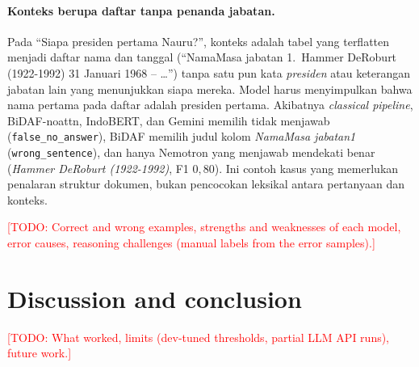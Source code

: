 \documentclass[11pt,a4paper]{article}
\newcommand{\todo}[1]{\textcolor{red}{[TODO: #1]}}
\begin{document}
\paragraph{Konteks berupa daftar tanpa penanda jabatan.}
Pada ``Siapa presiden pertama Nauru?'', konteks adalah tabel yang terflatten menjadi daftar nama dan tanggal
(``NamaMasa jabatan 1.\ Hammer DeRoburt (1922-1992) 31 Januari 1968 -- \ldots{}'') tanpa satu pun kata \textit{presiden}
atau keterangan jabatan lain yang menunjukkan siapa mereka. Model harus menyimpulkan bahwa nama pertama pada daftar adalah
presiden pertama. Akibatnya \textit{classical pipeline}, BiDAF-noattn, IndoBERT, dan Gemini memilih tidak menjawab
(\texttt{false\_no\_answer}), BiDAF memilih judul kolom \textit{NamaMasa jabatan1} (\texttt{wrong\_sentence}), dan hanya
Nemotron yang menjawab mendekati benar (\textit{Hammer DeRoburt (1922-1992)}, F1 $0{,}80$). Ini contoh kasus yang
memerlukan penalaran struktur dokumen, bukan pencocokan leksikal antara pertanyaan dan konteks.

\todo{Correct and wrong examples, strengths and weaknesses of each model, error causes, reasoning challenges
(manual labels from the error samples).}

\section{Discussion and conclusion}
\todo{What worked, limits (dev-tuned thresholds, partial LLM API runs), future work.}
\end{document}
